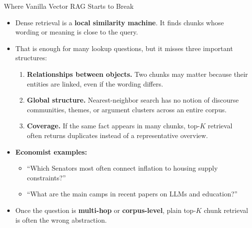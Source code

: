 \begin{frame}{Where Vanilla Vector RAG Starts to Break}
\begin{itemize}
\item Dense retrieval is a \textbf{local similarity machine}. It finds chunks whose wording or meaning is close to the query.

\medskip
\item That is enough for many lookup questions, but it misses three important structures:
\begin{enumerate}
    \item \textbf{Relationships between objects.} Two chunks may matter because their entities are linked, even if the wording differs.
    \item \textbf{Global structure.} Nearest-neighbor search has no notion of discourse communities, themes, or argument clusters across an entire corpus.
    \item \textbf{Coverage.} If the same fact appears in many chunks, top-$K$ retrieval often returns duplicates instead of a representative overview.
\end{enumerate}

\medskip
\item \textbf{Economist examples:}
\begin{itemize}
    \item ``Which Senators most often connect inflation to housing supply constraints?''
    \item ``What are the main camps in recent papers on LLMs and education?''
\end{itemize}

\medskip
\item Once the question is \textbf{multi-hop} or \textbf{corpus-level}, plain top-$K$ chunk retrieval is often the wrong abstraction.
\end{itemize}
\end{frame}

